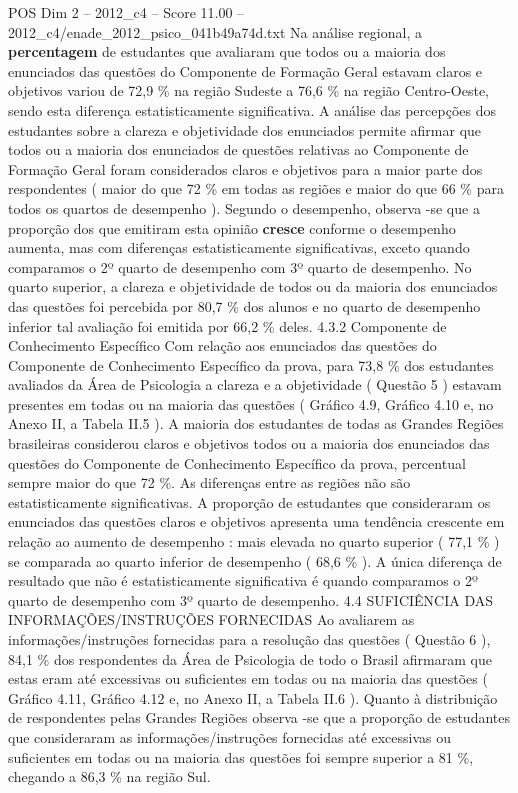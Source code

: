 \begin{textsample}{POS Dim 2 – 2012\_c4 – Score 11.00 – 2012\_c4/enade\_2012\_psico\_041b49a74d.txt}
Na análise regional, a \textbf{percentagem} de estudantes que avaliaram que todos ou a maioria dos enunciados das questões do Componente de Formação Geral estavam claros e objetivos variou de 72,9 \% na região Sudeste a 76,6 \% na região Centro-Oeste, sendo esta diferença estatisticamente significativa.
A análise das percepções dos estudantes sobre a clareza e objetividade dos enunciados permite afirmar que todos ou a maioria dos enunciados de questões relativas ao Componente de Formação Geral foram considerados claros e objetivos para a maior parte dos respondentes ( maior do que 72 \% em todas as regiões e maior do que 66 \% para todos os quartos de desempenho ).
Segundo o desempenho, observa -se que a proporção dos que emitiram esta opinião \textbf{cresce} conforme o desempenho aumenta, mas com diferenças estatisticamente significativas, exceto quando comparamos o 2º quarto de desempenho com 3º quarto de desempenho.
No quarto superior, a clareza e objetividade de todos ou da maioria dos enunciados das questões foi percebida por 80,7 \% dos alunos e no quarto de desempenho inferior tal avaliação foi emitida por 66,2 \% deles. 4.3.2 Componente de Conhecimento Específico Com relação aos enunciados das questões do Componente de Conhecimento Específico da prova, para 73,8 \% dos estudantes avaliados da Área de Psicologia a clareza e a objetividade ( Questão 5 ) estavam presentes em todas ou na maioria das questões ( Gráfico 4.9, Gráfico 4.10 e, no Anexo II, a Tabela II.5 ).
A maioria dos estudantes de todas as Grandes Regiões brasileiras considerou claros e objetivos todos ou a maioria dos enunciados das questões do Componente de Conhecimento Específico da prova, percentual sempre maior do que 72 \%.
As diferenças entre as regiões não são estatisticamente significativas.
A proporção de estudantes que consideraram os enunciados das questões claros e objetivos apresenta uma tendência crescente em relação ao aumento de desempenho : mais elevada no quarto superior ( 77,1 \% ) se comparada ao quarto inferior de desempenho ( 68,6 \% ).
A única diferença de resultado que não é estatisticamente significativa é quando comparamos o 2º quarto de desempenho com 3º quarto de desempenho. 4.4 SUFICIÊNCIA DAS INFORMAÇÕES/INSTRUÇÕES FORNECIDAS Ao avaliarem as informações/instruções fornecidas para a resolução das questões ( Questão 6 ), 84,1 \% dos respondentes da Área de Psicologia de todo o Brasil afirmaram que estas eram até excessivas ou suficientes em todas ou na maioria das questões ( Gráfico 4.11, Gráfico 4.12 e, no Anexo II, a Tabela II.6 ).
Quanto à distribuição de respondentes pelas Grandes Regiões observa -se que a proporção de estudantes que consideraram as informações/instruções fornecidas até excessivas ou suficientes em todas ou na maioria das questões foi sempre superior a 81 \%, chegando a 86,3 \% na região Sul.

\end{textsample}
